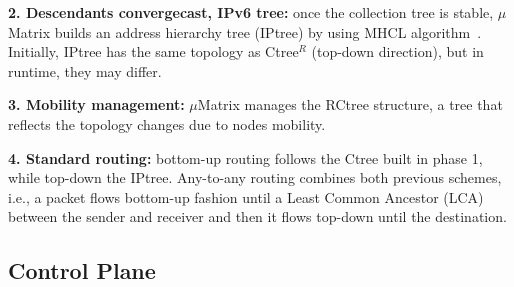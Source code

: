 \noindent \textbf{2. Descendants convergecast, IPv6 tree:} once the collection tree is stable, $\mu$Matrix builds an address hierarchy tree (IPtree) by using MHCL algorithm~\cite{Peres:2016, PeresG16:2016}. Initially, IPtree has the same topology as Ctree$^R$ (top-down direction), but in runtime, they may differ.

\noindent \textbf{3. Mobility management:} $\mu$Matrix manages the RCtree structure, a tree that reflects the topology changes due to nodes mobility.

\noindent  \textbf{4. Standard routing:} bottom-up routing follows the Ctree built in phase 1, while top-down the IPtree. Any-to-any routing combines both previous schemes, i.e., a packet flows bottom-up fashion until a Least Common Ancestor (LCA) between the sender and receiver and then it flows top-down until the destination.



\subsection{Control Plane}
\label{subsec:control-plane}


